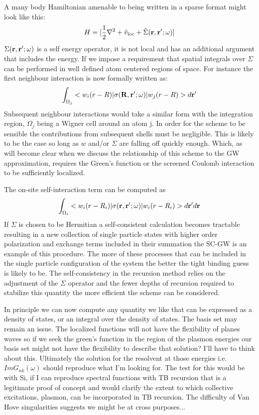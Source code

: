 \documentclass{article}
\def\r{{\bf r}}
\def\R{{\bf R}}
\begin{document}
A many body Hamiltonian amenable to being written in a sparse format might look like this:
%
\begin{equation}
H = [\frac{1}{2}\nabla^{2} + \tilde{v}_{\rm loc} + \hat{\Sigma}(\r,\r';\omega)]
\end{equation}
%
	$\Sigma(\r,\r';\omega)$ is a self energy operator, it is not local and 
has an additional argument that includes the energy.
If we impose a requirement that spatial integrals over $\Sigma$ can be performed in 
well defined atom centered regions of space. For instance 
the first neighbour interaction is now formally written as: 
%
\begin{equation}
\int_{\Omega_{j}}<w_{i}(r-R)|\sigma(\R,\r';\omega)|w_{j}(r-R)>d\r'
\end{equation}
%
	Subsequent neighbour interactions would take a similar form
with the integration region, $\Omega_{j}$ being a Wigner cell around an 
atom j. In order for the scheme to be sensible the contributions from subsequent shells 
must be negligible. This is likely to be the case so long as $w$ and/or $\Sigma$ 
are falling off quickly enough. Which, as will become clear when we discuss
the relationship of this scheme to the GW approximation, requires 
the Green's function or the screened Coulomb interaction 
to be sufficiently localized.

The on-site self-interaction term can be computed as
%
\begin{equation}
\int_{\Omega_{i}}<w_{i}(r-R_{i})|\sigma(\r,\r';\omega)|w_{i}(r-R_{i})>d\r'd\r
\end{equation}
%
If $\Sigma$ is chosen to be Hermitian a self-consistent calculation 
becomes tractable resulting in a new collection of single particle 
states with higher order polarization and exchange terms included 
in their summation the SC-GW is an example of this procedure. The more of
these processes that can be included in the single particle configuration of the
system the better the tight binding guess is likely to be. The self-consistency
in the recursion method relies on the adjustment of the $\Sigma$ operator and the
fewer depths of recursion required to stabilize this quantity the more efficient the
scheme can be considered.

In principle we can now compute any quantity we like that can be expressed
as a density of states, or an integral over the density of states.
The basis set may remain an issue. The localized functions will not have the 
flexibility of planes waves so if we seek the green's function in the 
region of the plasmon energies our basis set might not have the flexibility 
to describe that solution? I'll have to think about this. Ultimately the 
solution for the resolvent at those energies i.e. $ImG_{nk}(\omega)$ should 
reproduce what I'm looking for. The test for this would be with Si, if 
I can reproduce spectral functions with TB recursion that is a legitimate 
proof of concept and would clarify the extent to which collective excitations,
plasmon, can be incorporated in TB recursion. The difficulty of 
Van Hove singularities suggests we might be at cross purposes...
\end{document}

